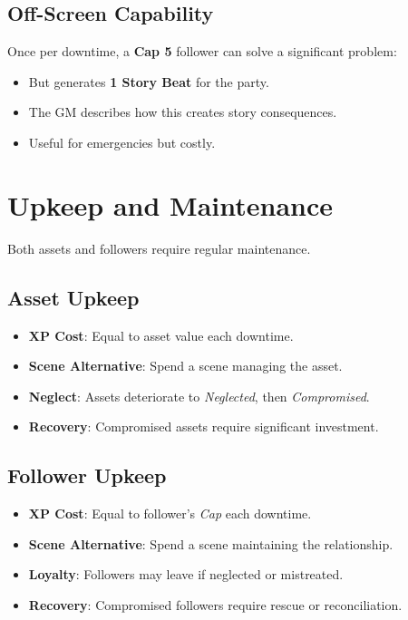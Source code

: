 \subsection*{Off-Screen Capability}
Once per downtime, a \textbf{Cap 5} follower can solve a significant problem:
\begin{itemize}
\item But generates \textbf{1 Story Beat} for the party.
\item The GM describes how this creates story consequences.
\item Useful for emergencies but costly.
\end{itemize}

\section{Upkeep and Maintenance}

Both assets and followers require regular maintenance.

\subsection*{Asset Upkeep}
\begin{itemize}
\item \textbf{XP Cost}: Equal to asset value each downtime.
\item \textbf{Scene Alternative}: Spend a scene managing the asset.
\item \textbf{Neglect}: Assets deteriorate to \emph{Neglected}, then \emph{Compromised}.
\item \textbf{Recovery}: Compromised assets require significant investment.
\end{itemize}

\subsection*{Follower Upkeep}
\begin{itemize}
\item \textbf{XP Cost}: Equal to follower's \emph{Cap} each downtime.
\item \textbf{Scene Alternative}: Spend a scene maintaining the relationship.
\item \textbf{Loyalty}: Followers may leave if neglected or mistreated.
\item \textbf{Recovery}: Compromised followers require rescue or reconciliation.
\end{itemize}

